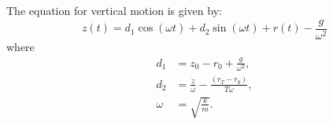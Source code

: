 \documentclass{article}
\begin{document}
The equation for vertical motion is given by:
\begin{equation}
    z(t) = d_1 \cos(\omega t) + d_2 \sin(\omega t) + r(t) - \frac{g}{\omega^2}
\end{equation}
where
\begin{align*}
    d_1 &= z_0 - r_0 + \frac{g}{\omega^2}, \\
    d_2 &= \frac{\dot{z}}{\omega} - \frac{(r_T - r_0)}{T \omega}, \\
    \omega &= \sqrt{\frac{k}{m}}.
\end{align*}
\end{document}
